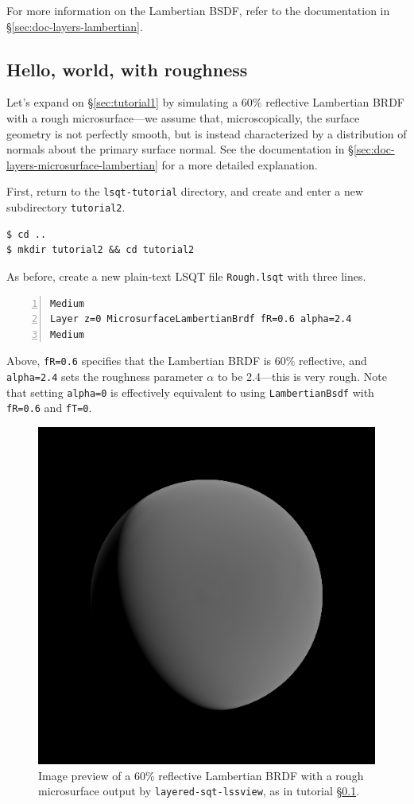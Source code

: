 \documentclass[
    twoside,
    twocolumn,
    letterpaper,
    10pt]{article}
\newcommand\namett[2]{{\color{code#1}\texttt{#2}}}
\begin{document}
For more information on the Lambertian BSDF, refer to 
the documentation in \S\ref{sec:doc-layers-lambertian}.

\subsection{Hello, world, with roughness}
\label{sec:tutorial2}

Let's expand on \S\ref{sec:tutorial1} by simulating a 60\% reflective
Lambertian BRDF with a rough microsurface---we assume that, microscopically,
the surface geometry is not perfectly smooth, but is instead characterized by 
a distribution of normals about the primary surface normal. See the 
documentation in \S\ref{sec:doc-layers-microsurface-lambertian} for a 
more detailed explanation.

First, return to the \texttt{lsqt-tutorial} directory, and create
and enter a new subdirectory \texttt{tutorial2}.
\begin{verbatim}
$ cd ..
$ mkdir tutorial2 && cd tutorial2
\end{verbatim}
As before, create a new plain-text LSQT file \texttt{Rough.lsqt} 
with three lines.
\begin{lstlisting}[numbers=left]
Medium
Layer z=0 MicrosurfaceLambertianBrdf fR=0.6 alpha=2.4
Medium
\end{lstlisting}
Above, \texttt{fR=0.6} specifies that the Lambertian BRDF is 60\% 
reflective, and \texttt{alpha=2.4} sets the roughness parameter
$\alpha$ to be 2.4---this is very rough. Note that setting 
\texttt{alpha=0} is effectively equivalent to using 
\namett{purple}{LambertianBsdf} with \texttt{fR=0.6} 
and \texttt{fT=0}.

\begin{figure}
\begin{center}
    \includegraphics[width=0.75\columnwidth]{tutorial2.png}
    \caption{Image preview of a 60\% reflective Lambertian BRDF
    with a rough microsurface output by \texttt{layered-sqt-lssview}, as 
    in tutorial \S\ref{sec:tutorial2}.
    \label{fig:tutorial2}}
\end{center}
\end{figure}
\end{document}
